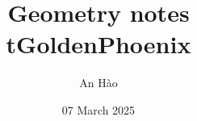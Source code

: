 \RequirePackage{standalone}

\usepackage[utf8]{inputenc}
\usepackage[T1]{fontenc}

\usepackage{blindtext} %
\usepackage{lipsum}  %
\usepackage{color,soul} %

\usepackage{amsmath, booktabs}
\usepackage{amsthm}
\usepackage{amssymb}
\usepackage{amsfonts}
\usepackage{mathtools}

\usepackage{MnSymbol} %

\usepackage{graphicx}
\usepackage{subcaption}
\graphicspath{ {./figures/} {./figures/img/} }




\usepackage[left=1.35in, right=1.35in, top=1.0in, bottom=.9in, headsep=.2in, footskip=0.35in]{geometry}

\renewcommand{\baselinestretch}{1.3}

\setlength{\parskip}{1.3mm}

\usepackage[vietnamese=nohyphenation]{hyphsubst} %
\usepackage[vietnamese]{babel}

\usepackage{hyperref} %
    

\usepackage{subfiles} %

\title{
	{Geometry notes}\\
	{\large tGoldenPhoenix}\\
}
\author{An Hào}
\date{07 March 2025}
